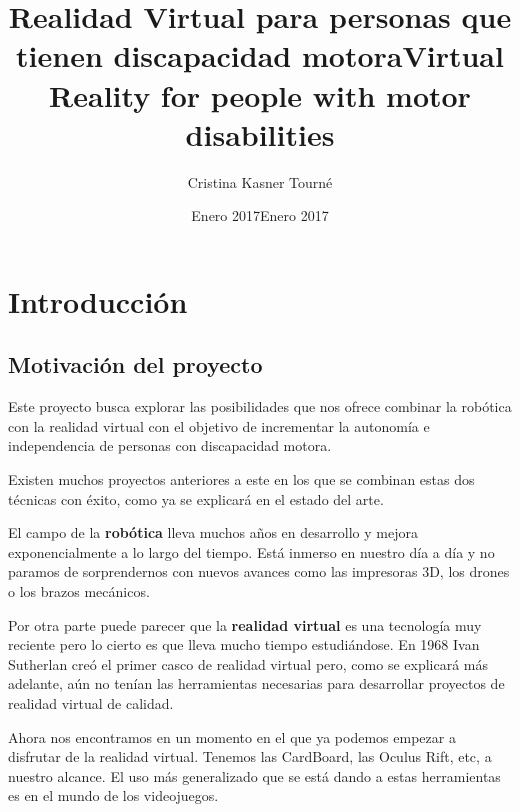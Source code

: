 \documentclass[twoside, 11pt]{epstfg}
\title[spa]{Realidad Virtual para personas que tienen discapacidad motora}
\title[eng]{Virtual Reality for people with motor disabilities}
\author{Cristina Kasner Tourné}
\date[spa]{Enero 2017}
\date[eng]{Enero 2017}
\begin{document}

\frontmatter

\maketitle[spa]

\makeinnertitle[spa]

\makeabstract[spa]
\makeabstract[eng]

\tableofcontents
\clearpage
\listoftables
\clearpage
\listoffigures
\cleardoublepage

\printnoidxglossaries

\mainmatter
\chapter{Introducción} 


\section{Motivación del proyecto}

Este proyecto busca explorar las posibilidades que nos ofrece combinar la robótica con la realidad virtual con el objetivo de incrementar la autonomía e independencia de personas con discapacidad motora.

Existen muchos proyectos anteriores a este en los que se combinan estas dos técnicas con éxito, como ya se explicará en el estado del arte.

El campo de la \textbf{robótica} lleva muchos años en desarrollo y mejora exponencialmente a lo largo del tiempo. Está inmerso en nuestro día a día y no paramos de sorprendernos con nuevos avances como las impresoras 3D, los drones o los brazos mecánicos.

Por otra parte puede parecer que la \textbf{realidad virtual} es una tecnología muy reciente pero lo cierto es que  lleva mucho tiempo estudiándose. En 1968 Ivan Sutherlan creó el primer casco de realidad virtual pero, como se explicará más adelante, aún no tenían las herramientas necesarias para desarrollar proyectos de realidad virtual de calidad.

Ahora nos encontramos en un momento en el que ya podemos empezar a disfrutar de la realidad virtual. Tenemos las CardBoard, las Oculus Rift, etc, a nuestro alcance.
El uso más generalizado que se está dando a estas herramientas es en el mundo de los videojuegos.
\end{document}
